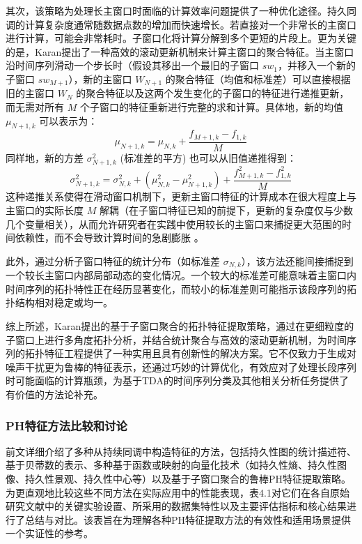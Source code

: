 其次，该策略为处理长主窗口时面临的计算效率问题提供了一种优化途径。持久同调的计算复杂度通常随数据点数的增加而快速增长。若直接对一个非常长的主窗口进行计算，可能会非常耗时。子窗口化将计算分解到多个更短的片段上。更为关键的是，Karan提出了一种高效的滚动更新机制来计算主窗口的聚合特征。当主窗口沿时间序列滑动一个步长时（假设其移出一个最旧的子窗口 $sw_1$，并移入一个新的子窗口 $sw_{M+1}$），新的主窗口 $W_{N+1}$ 的聚合特征（均值和标准差）可以直接根据旧的主窗口 $W_N$ 的聚合特征以及这两个发生变化的子窗口的特征进行递推更新，而无需对所有 $M$ 个子窗口的特征重新进行完整的求和计算。具体地，新的均值 $\mu_{N+1,k}$ 可以表示为：
\begin{equation}
    \mu_{N+1,k} = \mu_{N,k} + \frac{f_{M+1,k} - f_{1,k}}{M}
    \label{eq:recursive_mean}
\end{equation}
同样地，新的方差 $\sigma_{N+1,k}^2$ (标准差的平方) 也可以从旧值递推得到：
\begin{equation}
    \sigma_{N+1,k}^2 = \sigma_{N,k}^2 + (\mu_{N,k}^2 - \mu_{N+1,k}^2) + \frac{f_{M+1,k}^2 - f_{1,k}^2}{M}
    \label{eq:recursive_variance}
\end{equation}
这种递推关系使得在滑动窗口机制下，更新主窗口特征的计算成本在很大程度上与主窗口的实际长度 $M$ 解耦（在子窗口特征已知的前提下，更新的复杂度仅与少数几个变量相关），从而允许研究者在实践中使用较长的主窗口来捕捉更大范围的时间依赖性，而不会导致计算时间的急剧膨胀 。

此外，通过分析子窗口特征的统计分布（如标准差 $\sigma_{N,k}$），该方法还能间接捕捉到一个较长主窗口内部局部动态的变化情况。一个较大的标准差可能意味着主窗口内时间序列的拓扑特性正在经历显著变化，而较小的标准差则可能指示该段序列的拓扑结构相对稳定或均一。

综上所述，Karan提出的基于子窗口聚合的拓扑特征提取策略，通过在更细粒度的子窗口上进行多角度拓扑分析，并结合统计聚合与高效的滚动更新机制，为时间序列的拓扑特征工程提供了一种实用且具有创新性的解决方案。它不仅致力于生成对噪声干扰更为鲁棒的特征表示，还通过巧妙的计算优化，有效应对了处理长段序列时可能面临的计算瓶颈，为基于TDA的时间序列分类及其他相关分析任务提供了有价值的方法论补充。

\subsubsection{PH特征方法比较和讨论}
前文详细介绍了多种从持续同调中构造特征的方法，包括持久性图的统计描述符、基于贝蒂数的表示、多种基于函数或映射的向量化技术（如持久性熵、持久性图像、持久性景观、持久性中心等）以及基于子窗口聚合的鲁棒PH特征提取策略。为更直观地比较这些不同方法在实际应用中的性能表现，表4.1对它们在各自原始研究文献中的关键实验设置、所采用的数据集特性以及主要评估指标和核心结果进行了总结与对比。该表旨在为理解各种PH特征提取方法的有效性和适用场景提供一个实证性的参考。



